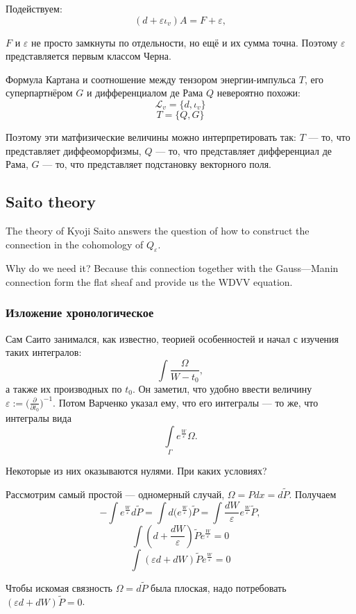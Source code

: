 \documentclass[11pt]{article}
\def\p{\partial}
\theoremstyle{remark}
\theoremstyle{definition}
\begin{document}
Подействуем: $$(d + \varepsilon \iota_v) A = F + \varepsilon,$$

$F$ и $\varepsilon$ не просто замкнуты по отдельности, но ещё и их сумма точна. Поэтому $\varepsilon$ представляется первым классом Черна.

Формула Картана и соотношение между тензором энергии-импульса $T$, его суперпартнёром $G$ и дифференциалом де Рама $Q$ невероятно похожи:
$$\mathcal{L}_v  = \{d, \iota_v\}$$
$$T = \{Q, G\}$$

Поэтому эти матфизические величины можно интерпретировать так: $T$ --- то, что представляет диффеоморфизмы, $Q$ --- то, что представляет дифференциал де Рама, $G$ --- то, что представляет подстановку векторного поля.

\subsection{Saito theory}

The theory of Kyoji Saito answers the question of how to construct the connection in the cohomology of $Q_{\varepsilon}$.

Why do we need it? Because this connection together with the Gauss---Manin connection form the flat sheaf and provide us the WDVV equation.


\subsubsection{Изложение хронологическое}

Сам Саито занимался, как известно, теорией особенностей и начал с изучения таких интегралов: $$\int \frac{\Omega}{W - t_0},$$ а также их производных по $t_0$. Он заметил, что удобно ввести величину $\varepsilon := \Big(\frac{\p}{\p t_0} \Big)^{-1}$. Потом Варченко указал ему, что его интегралы --- то же, что интегралы вида $$\int\limits_{\Gamma} e^{\frac{W}{\varepsilon}} \Omega.$$

Некоторые из них оказываются нулями. При каких условиях?

Рассмотрим самый простой --- одномерный случай, $\Omega = P dx = d\tilde P$. Получаем $$- \int e^{\frac{W}{\varepsilon}} d\tilde P = \int d \Big( e^{\frac{W}{\varepsilon}} \Big) \tilde P = \int \frac{dW}{\varepsilon} e^{\frac{W}{\varepsilon}} \tilde P,$$ $$\int (d + \frac{dW}{\varepsilon}) \tilde P e^{\frac{W}{\varepsilon}} = 0$$ $$\int (\varepsilon d + dW) \tilde P e^{\frac{W}{\varepsilon}} = 0$$

Чтобы искомая связность $\Omega = d\tilde P$ была плоская, надо потребовать $(\varepsilon d + dW) \tilde P = 0$.
\end{document}
